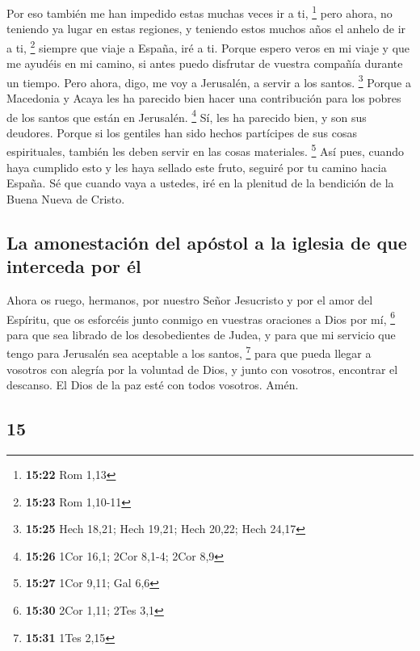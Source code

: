 \begin{paracol}{2}
 Por eso también me han impedido estas muchas veces ir a
ti, \footnote{\textbf{15:22} Rom 1,13}  pero ahora, no
teniendo ya lugar en estas regiones, y teniendo estos muchos años el
anhelo de ir a ti, \footnote{\textbf{15:23} Rom 1,10-11} 
siempre que viaje a España, iré a ti. Porque espero veros en mi viaje y
que me ayudéis en mi camino, si antes puedo disfrutar de vuestra
compañía durante un tiempo.  Pero ahora, digo, me voy a
Jerusalén, a servir a los santos. \footnote{\textbf{15:25} Hech 18,21;
  Hech 19,21; Hech 20,22; Hech 24,17}  Porque a Macedonia
y Acaya les ha parecido bien hacer una contribución para los pobres de
los santos que están en Jerusalén. \footnote{\textbf{15:26} 1Cor 16,1;
  2Cor 8,1-4; 2Cor 8,9}  Sí, les ha parecido bien, y son
sus deudores. Porque si los gentiles han sido hechos partícipes de sus
cosas espirituales, también les deben servir en las cosas materiales.
\footnote{\textbf{15:27} 1Cor 9,11; Gal 6,6}  Así pues,
cuando haya cumplido esto y les haya sellado este fruto, seguiré por tu
camino hacia España.  Sé que cuando vaya a ustedes, iré
en la plenitud de la bendición de la Buena Nueva de Cristo.

\hypertarget{la-amonestaciuxf3n-del-apuxf3stol-a-la-iglesia-de-que-interceda-por-uxe9l}{%
\subsection{La amonestación del apóstol a la iglesia de que interceda
por
él}\label{la-amonestaciuxf3n-del-apuxf3stol-a-la-iglesia-de-que-interceda-por-uxe9l}}

 Ahora os ruego, hermanos, por nuestro Señor Jesucristo y
por el amor del Espíritu, que os esforcéis junto conmigo en vuestras
oraciones a Dios por mí, \footnote{\textbf{15:30} 2Cor 1,11; 2Tes 3,1}
 para que sea librado de los desobedientes de Judea, y
para que mi servicio que tengo para Jerusalén sea aceptable a los
santos, \footnote{\textbf{15:31} 1Tes 2,15}  para que
pueda llegar a vosotros con alegría por la voluntad de Dios, y junto con
vosotros, encontrar el descanso.  El Dios de la paz esté
con todos vosotros. Amén.

\switchcolumn
\begin{otherlanguage}{english}

\hypertarget{section-29}{%
\section{15}\label{section-29}}


\end{otherlanguage}
\end{paracol}
